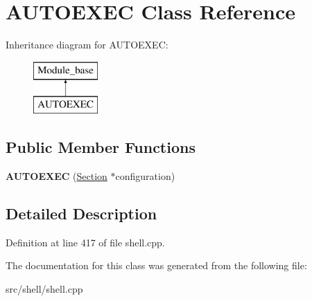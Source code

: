 \hypertarget{classAUTOEXEC}{\section{A\-U\-T\-O\-E\-X\-E\-C Class Reference}
\label{classAUTOEXEC}
}
Inheritance diagram for A\-U\-T\-O\-E\-X\-E\-C\-:\begin{figure}[H]
\begin{center}
\leavevmode
\includegraphics[height=2.000000cm]{classAUTOEXEC}
\end{center}
\end{figure}
\subsection*{Public Member Functions}
\begin{DoxyCompactItemize}
\item 
\hypertarget{classAUTOEXEC_a0c36ab7cc15d2e8ed2fc590cafc89672}{{\bfseries A\-U\-T\-O\-E\-X\-E\-C} (\hyperlink{classSection}{Section} $\ast$configuration)}\label{classAUTOEXEC_a0c36ab7cc15d2e8ed2fc590cafc89672}

\end{DoxyCompactItemize}


\subsection{Detailed Description}


Definition at line 417 of file shell.\-cpp.



The documentation for this class was generated from the following file\-:\begin{DoxyCompactItemize}
\item 
src/shell/shell.\-cpp\end{DoxyCompactItemize}
